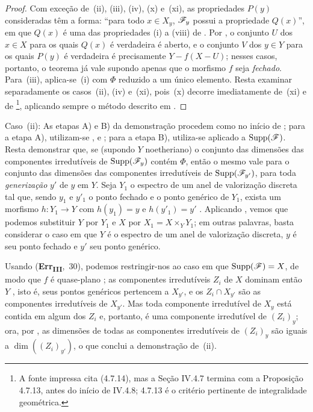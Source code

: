 \begin{proof}
Com exceção de~(ii), (iii), (iv), (x)
e~(xi), as propriedades $P(y)$
consideradas têm a forma: “para todo
$x\in X_y$, $\mathscr{F}_y$ possui a
propriedade $Q(x)$”, em que $Q(x)$
é uma das propriedades (i) a (viii)
de . Por
, o conjunto $U$ dos
$x\in X$ para os quais $Q(x)$ é
verdadeira é aberto, e o conjunto
$V$ dos $y\in Y$ para os quais
$P(y)$ é verdadeira é precisamente
$Y-f(X-U)$; nesses casos, portanto,
o teorema já vale supondo apenas que
o morfismo $f$ seja \emph{fechado}.
Para~(iii), aplica-se~(i) com
$\Phi$ reduzido a um único elemento.
Resta examinar separadamente os
casos~(ii), (iv) e~(xi), pois~(x)
decorre imediatamente de~(xi) e de
\footnote{A fonte
impressa cita (4.7.14), mas a Seção
IV.4.7 termina com a Proposição
4.7.13, antes do início de IV.4.8;
4.7.13 é o critério pertinente de
integralidade geométrica.},
aplicando sempre o método descrito
em .
\end{proof}

\begin{env}[12.2.1.1]
\label{IV.12.2.1.1}
Caso~(ii): As etapas A) e B) da
demonstração procedem como no início de
; para a etapa A),
utilizam-se ,
 e ;
para a etapa B), utiliza-se
 aplicado a
$\operatorname{Supp}(\mathscr{F})$. Resta
demonstrar que, se (supondo $Y$
noetheriano) o conjunto das dimensões
das componentes irredutíveis de
$\operatorname{Supp}(\mathscr{F}_y)$ contém
$\Phi$, então o mesmo vale para o
conjunto das dimensões das componentes
irredutíveis de
$\operatorname{Supp}(\mathscr{F}_{y'})$,
para toda \emph{generização} $y'$
de $y$ em $Y$. Seja $Y_1$ o espectro
de um anel de valorização discreta
tal que, sendo $y_1$ e $y'_1$ o ponto
fechado e o ponto genérico de $Y_1$,
exista um morfismo $h:Y_1\to Y$ com
$h(y_1)=y$ e $h(y'_1)=y'$
. Aplicando
, vemos que podemos
substituir $Y$ por $Y_1$ e $X$ por
$X_1=X\times_Y Y_1$; em outras
palavras, basta considerar o caso em
que $Y$ é o espectro de um anel de
valorização discreta, $y$ é seu
ponto fechado e $y'$ seu ponto
genérico.

Usando (\textbf{Err}\textsubscript{\textbf{III}},~30),
podemos restringir-nos ao caso em que
$\operatorname{Supp}(\mathscr{F})=X$, de
modo que $f$ é quase-plano
; as componentes
irredutíveis $Z_i$ de $X$ dominam
então $Y$ , isto é,
seus pontos genéricos pertencem a
$X_{y'}$, e os $Z_i\cap X_{y'}$
são as componentes irredutíveis de
$X_{y'}$. Mas toda componente
irredutível de $X_y$ está contida
em algum dos $Z_i$ e, portanto,
é uma componente irredutível de
$(Z_i)_y$; ora, por
, as dimensões de
todas as componentes irredutíveis
de $(Z_i)_y$ são iguais a
$\dim((Z_i)_{y'})$, o que conclui
a demonstração de~(ii).
\end{env}

